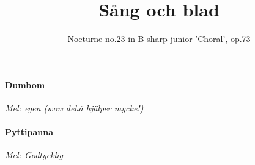 \documentclass[12pt]{article}
\title{%
  Sång och blad }
\author{Nocturne no.23 in B-sharp junior 'Choral', op.73}
\date{}
\begin{document}
\maketitle
\thispagestyle{empty}
\renewcommand\thepage{%
\ifcase\value{page}%
43\or
87\or
16\or
7\or
42\or
33\or
103\or
71\or
17\else

\arabic{page}%
\fi}


\newpage
\noindent
\begin{minipage}{.475\textwidth}
	\noindent
	\paragraph*{Dumbom\\}
	\vspace{3px}
	\textit{Mel: egen (wow dehä hjälper mycke!)}\\
\end{minipage}%
\hspace{0.075\textwidth}
\noindent
\begin{minipage}{.45\textwidth}
	\noindent
	\paragraph*{Pyttipanna\\} 
	\vspace{3px}
	\textit{Mel: Godtycklig}\\
\end{minipage}
\end{document}
